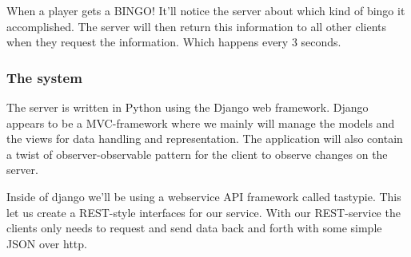 When a player gets a BINGO! It'll notice the server about which kind of bingo it accomplished. The server will then return this information to all other clients when they request the information. Which happens every 3 seconds.

\subsubsection{The system}
The server is written in Python using the Django web framework. Django appears to be a MVC-framework where we mainly will manage the models and the views for data handling and representation. The application will also contain a twist of observer-observable pattern for the client to observe changes on the server.

Inside of django we'll be using a webservice API framework called tastypie. This let us create a REST-style interfaces for our service. With our REST-service the clients only needs to request and send data back and forth with some simple JSON over http.

